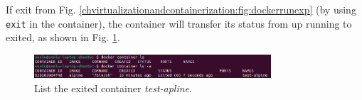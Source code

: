 If exit from Fig. \ref{chvirtualizationandcontainerization:fig:dockerrunexp} (by using \verb|exit| in the container), the container will transfer its status from up running to exited, as shown in Fig. \ref{chvirtualizationandcontainerization:fig:dockerrunexppart3}.
\begin{figure}
	\centering
	\includegraphics[width=250pt]{chapters/ch_virtualization_and_containerization/figures/dockerrunexppart3.png}
	\caption{List the exited container \textit{test-apline}.} \label{chvirtualizationandcontainerization:fig:dockerrunexppart3}
\end{figure}







